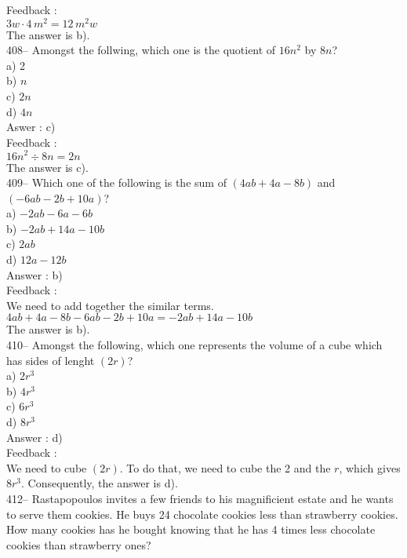 \documentclass[letterpaper, 12pt]{article}
\begin{document}
Feedback : \\
$3w\cdot 4\,m^{2}=12\,m^{2}w$\\
The answer is b).\\

408-- Amongst the follwing, which one is the quotient of $16n^{2}$
by $8n$?\\
a) 2\\
b) $n$\\
c) $2n$\\
d) $4n$\\

Aswer : c)\\

Feedback : \\
$16n^{2}\div8n=2n$\\
The answer is c).\\

409-- Which one of the following is the sum of
$\left(4ab+4a-8b\right) $ and $\left(-6ab-2b+10a\right)$?\\
a) $-2ab-6a-6b$\\
b) $-2ab+14a-10b$\\
c) $2ab$\\
d) $12a-12b$\\

Answer : b)\\

Feedback : \\
We need to add together the similar terms.\\
$4ab+4a-8b-6ab-2b+10a=-2ab+14a-10b$\\
The answer is b).\\

410-- Amongst the following, which one represents the volume of a cube which has sides of lenght $\left( 2r\right)$?\\
a) $2r^{3}$\\
b) $4r^{3}$ \\
c) $6r^{3}$\\
d) $8r^{3}$\\

Answer : d)\\

Feedback : \\
We need to cube $\left( 2r\right)$. To do that, we need to cube the 2 and the $r$, which gives $8r^{3}$. Consequently, the answer is d).\\


412-- Rastapopoulos invites a few friends to his magnificient estate and he wants to serve them cookies. He buys 24 chocolate cookies less than strawberry cookies. How many cookies has he bought knowing that he has 4 times less chocolate cookies than strawberry ones?\\
\end{document}

